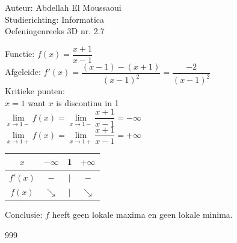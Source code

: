 \documentclass[a4paper]{article}
\begin{document}
  
\noindent \large Auteur: Abdellah El Moussaoui \\
\noindent \large Studierichting: Informatica\\
\noindent \large Oefeningenreeks 3D nr. 2.7\\

\medskip

\normalsize


Functie: $f(x) = \dfrac{x + 1}{x - 1}$ \\

Afgeleide: $f'(x) = \dfrac{\left(x-1\right) - \left(x+1\right)}{\left( x - 1\right)^2} = \dfrac{-2}{\left( x - 1\right)^2} $\\

Kritieke punten: \\

$x= 1$ want $x$ is discontinu in 1 \\

$\lim\limits_{x \rightarrow 1-} f(x) = \lim\limits_{x \rightarrow 1-} \dfrac{x + 1}{x - 1} = -\infty$\\

$\lim\limits_{x \rightarrow 1+} f(x) = \lim\limits_{x \rightarrow 1+} \dfrac{x + 1}{x - 1} = +\infty$\\


\begin{tabular}{c|ccc}
        $x$     & $-\infty$ &  1  & $+\infty$\\ 
        \hline
        $f'(x)$ & $-$       &  $|$  & $-$ \\ 
        \hline
        $f(x)$  & $\searrow$  & $|$   & $\searrow$ \\
\end{tabular}

\bigskip

Conclusie: $f$ heeft geen lokale maxima en geen lokale minima.\\

\begin{thebibliography}{999}
\end{thebibliography}
\end{document}
